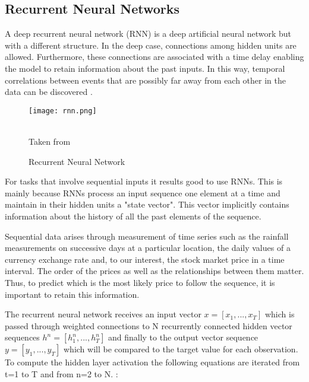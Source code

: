 \subsection{Recurrent Neural Networks}

A deep recurrent neural network (RNN) is a deep artificial neural network but with a different structure. In the deep case, connections among hidden units are allowed. Furthermore, these connections are associated with a time delay enabling the model to retain information about the past inputs. In this way, temporal correlations between events that are possibly far away from each other in the data can be discovered \cite{pascanu2013difficulty}.

\begin{figure}
\center
\texttt{[image: rnn.png]}
\caption{Recurrent Neural Network}
\label{fig:r_nn}
\begin{minipage}{12cm}
    \footnotesize
    \center
    \emph \\ Taken from \cite{lecun2015deep}
    \end{minipage}
\end{figure}
For tasks that involve sequential inputs it results good to use RNNs. This is mainly because RNNs process an input sequence one element at a time and maintain in their hidden units a "state vector". This vector implicitly contains information about the history of all the past elements of the sequence.\cite{lecun2015deep} 

Sequential data arises through measurement of time series such as the rainfall measurements on successive days at a particular location, the daily values of a currency exchange rate and, to our interest, the stock market price in a time interval. The order of the prices as well as the relationships between them matter. Thus, to predict which is the most likely price to follow the sequence, it is important to retain this information.

The recurrent neural network receives an input vector $x=[x_1,...,x_T]$ which is passed through weighted connections to N recurrently connected hidden vector sequences $h^n=[h_1^n,...,h_T^n]$ and finally to the output vector sequence $y=[y_1,...,y_T]$ which will be compared to the target value for each observation. To compute the hidden layer activation the following equations are iterated from t=1 to T and from n=2 to N. \cite{graves2013generating}:


